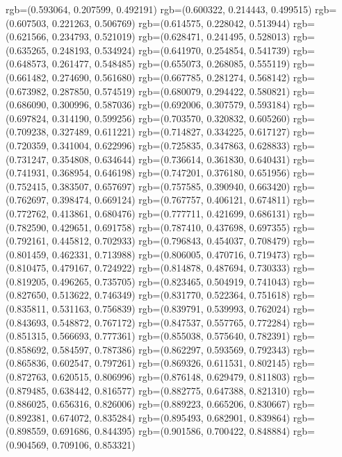 {{{					rgb=(0.593064, 0.207599, 0.492191)
					rgb=(0.600322, 0.214443, 0.499515)
					rgb=(0.607503, 0.221263, 0.506769)
					rgb=(0.614575, 0.228042, 0.513944)
					rgb=(0.621566, 0.234793, 0.521019)
					rgb=(0.628471, 0.241495, 0.528013)
					rgb=(0.635265, 0.248193, 0.534924)
					rgb=(0.641970, 0.254854, 0.541739)
					rgb=(0.648573, 0.261477, 0.548485)
					rgb=(0.655073, 0.268085, 0.555119)
					rgb=(0.661482, 0.274690, 0.561680)
					rgb=(0.667785, 0.281274, 0.568142)
					rgb=(0.673982, 0.287850, 0.574519)
					rgb=(0.680079, 0.294422, 0.580821)
					rgb=(0.686090, 0.300996, 0.587036)
					rgb=(0.692006, 0.307579, 0.593184)
					rgb=(0.697824, 0.314190, 0.599256)
					rgb=(0.703570, 0.320832, 0.605260)
					rgb=(0.709238, 0.327489, 0.611221)
					rgb=(0.714827, 0.334225, 0.617127)
					rgb=(0.720359, 0.341004, 0.622996)
					rgb=(0.725835, 0.347863, 0.628833)
					rgb=(0.731247, 0.354808, 0.634644)
					rgb=(0.736614, 0.361830, 0.640431)
					rgb=(0.741931, 0.368954, 0.646198)
					rgb=(0.747201, 0.376180, 0.651956)
					rgb=(0.752415, 0.383507, 0.657697)
					rgb=(0.757585, 0.390940, 0.663420)
					rgb=(0.762697, 0.398474, 0.669124)
					rgb=(0.767757, 0.406121, 0.674811)
					rgb=(0.772762, 0.413861, 0.680476)
					rgb=(0.777711, 0.421699, 0.686131)
					rgb=(0.782590, 0.429651, 0.691758)
					rgb=(0.787410, 0.437698, 0.697355)
					rgb=(0.792161, 0.445812, 0.702933)
					rgb=(0.796843, 0.454037, 0.708479)
					rgb=(0.801459, 0.462331, 0.713988)
					rgb=(0.806005, 0.470716, 0.719473)
					rgb=(0.810475, 0.479167, 0.724922)
					rgb=(0.814878, 0.487694, 0.730333)
					rgb=(0.819205, 0.496265, 0.735705)
					rgb=(0.823465, 0.504919, 0.741043)
					rgb=(0.827650, 0.513622, 0.746349)
					rgb=(0.831770, 0.522364, 0.751618)
					rgb=(0.835811, 0.531163, 0.756839)
					rgb=(0.839791, 0.539993, 0.762024)
					rgb=(0.843693, 0.548872, 0.767172)
					rgb=(0.847537, 0.557765, 0.772284)
					rgb=(0.851315, 0.566693, 0.777361)
					rgb=(0.855038, 0.575640, 0.782391)
					rgb=(0.858692, 0.584597, 0.787386)
					rgb=(0.862297, 0.593569, 0.792343)
					rgb=(0.865836, 0.602547, 0.797261)
					rgb=(0.869326, 0.611531, 0.802145)
					rgb=(0.872763, 0.620515, 0.806996)
					rgb=(0.876148, 0.629479, 0.811803)
					rgb=(0.879485, 0.638442, 0.816577)
					rgb=(0.882775, 0.647388, 0.821310)
					rgb=(0.886025, 0.656316, 0.826006)
					rgb=(0.889223, 0.665206, 0.830667)
					rgb=(0.892381, 0.674072, 0.835284)
					rgb=(0.895493, 0.682901, 0.839864)
					rgb=(0.898559, 0.691686, 0.844395)
					rgb=(0.901586, 0.700422, 0.848884)
					rgb=(0.904569, 0.709106, 0.853321)
}}}
